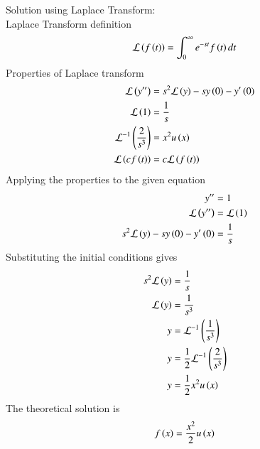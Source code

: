\documentclass[journal]{IEEEtran}
\begin{document}
Solution using Laplace Transform:\\
Laplace Transform definition\\
\begin{align}
	\mathcal{L}\left(f\left(t\right)\right) = \int_{0}^{\infty}e^{-st}f\left(t\right)dt
\end{align}
Properties of Laplace transform
\begin{align}
	\mathcal{L}\left(y^{\prime\prime}\right) &= s^2\mathcal{L}\left(y\right) -sy\left(0\right)-y^\prime\left(0\right)\\
	\mathcal{L}\left(1\right) &= \frac{1}{s}\\
	\mathcal{L}^{-1}\left(\frac{2}{s^3}\right) &= x^2u\left(x\right)\\
	\mathcal{L}\left(cf\left(t\right)\right) &= c\mathcal{L}\left(f\left(t\right)\right)
\end{align}
Applying the properties to the given equation
\begin{align}
	y^{\prime\prime} &= 1\\
	\mathcal{L}\left(y^{\prime\prime}\right) &= \mathcal{L}\left(1\right)\\
	s^2\mathcal{L}\left(y\right) -sy\left(0\right)-y^\prime\left(0\right) &= \frac{1}{s}
\end{align}
Substituting the initial conditions gives
\begin{align}
	s^2\mathcal{L}\left(y\right) &= \frac{1}{s}\\
	\mathcal{L}\left(y\right) &= \frac{1}{s^3}\\
	y &= \mathcal{L}^{-1}\left(\frac{1}{s^3}\right)\\
	y &= \frac{1}{2}\mathcal{L}^{-1}\left(\frac{2}{s^3}\right)\\
	y &= \frac{1}{2}x^2u\left(x\right)
\end{align}
The theoretical solution is 
\begin{align}
	f\left(x\right) = \frac{x^2}{2}u\left(x\right)
\end{align}
\end{document}
